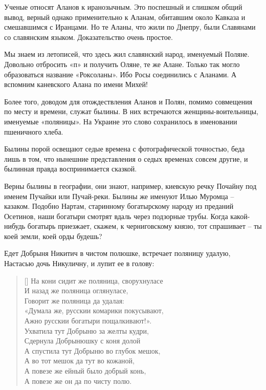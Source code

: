 Ученые относят Аланов к иранозычным. Это поспешный и слишком общий вывод, верный однако применительно к Аланам, обитавшим около Кавказа и смешавшимся с Иранцами. Но те Аланы, что жили по Днепру, были Славянами со славянским языком. Доказательство очень простое.

Мы знаем из летописей, что здесь жил славянский народ, именуемый Поляне. Довольно отбросить «п» и получить Оляне, те же Алане. Только так могло образоваться название «Роксоланы». Ибо Росы соединились с Аланами. А вспомним каневского Алана по имени Михей!

Более того, доводом для отождествления Аланов и Полян, помимо совмещения по месту и времени, служат былины. В них встречаются женщины-воительницы, именуемые «поляницы». На Украине это слово сохранилось в именовании пшеничного хлеба.

Былины порой освещают седые времена с фотографической точностью, беда лишь в том, что нынешние представления о седых временах совсем другие, и былинная правда воспринимается сказкой.

Верны былины в географии, они знают, например, киевскую речку Почайну под именем Пучайки или Пучай-реки. Былины же именуют Илью Муромца – казаком. Подобно Нартам, старинному богатырскому народу из преданий Осетинов, наши богатыри смотрят вдаль через подзорные трубы. Когда какой-нибудь богатырь приезжает, скажем, к черниговскому князю, тот спрашивает – ты коей земли, коей орды будешь?

Едет Добрыня Никитич в чистом полюшке, встречает поляницу удалую, Настасью дочь Никуличну, и лупит ее в голову\cite{gilder01}: 

\settowidth{\versewidth}{«Думала же, русскии комарики покусывают,} 
\begin{verse}[\versewidth]
На кони сидит же поляница, сворухнуласе\\
И назад же поляница оглянуласе,\\
Говорит же поляница да удалая:\\
«Думала же, русскии комарики покусывают,\\
Ажно русскии богатыри пощалкивают!».\\
Ухватила тут Добрыню за желты кудри,\\
Сдернула Добрынюшку с коня долой\\
А спустила тут Добрыню во глубок мешок,\\
А во тот мешок да тут во кожаной,\\
А повезе же ейный было добрый конь,\\
А повезе же он да по чисту полю.
\end{verse}

